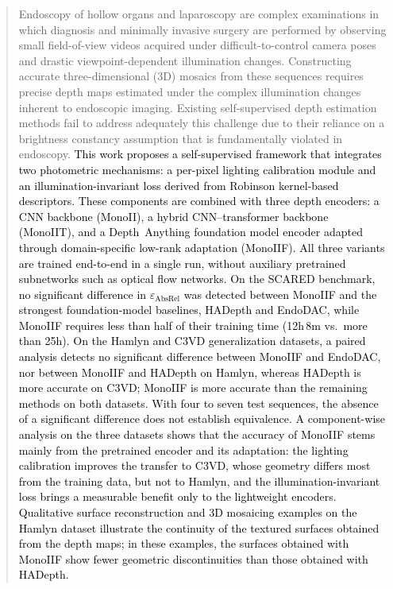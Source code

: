 \documentclass[a4paper,fleqn]{cas-dc}
\begin{document}
\maketitle
\begin{abstract}
%
Endoscopy of hollow organs and laparoscopy are complex examinations 
in which diagnosis and minimally invasive surgery are performed by observing small field-of-view videos acquired under difficult-to-control camera poses and drastic viewpoint-dependent illumination changes.  Constructing accurate three-dimensional (3D) mosaics from these sequences requires precise depth maps estimated under the complex illumination changes inherent to endoscopic imaging.  Existing self-supervised depth estimation methods fail to address adequately this challenge due to their reliance on a brightness constancy assumption that is fundamentally violated in endoscopy. \textcolor{black}{This work proposes a self-supervised framework that integrates two photometric mechanisms: a per-pixel lighting calibration module and an illumination-invariant loss derived from Robinson kernel-based descriptors. These components are combined with three depth encoders: a CNN backbone (MonoII), a hybrid CNN--transformer backbone (MonoIIT), and a Depth~Anything foundation model encoder adapted through domain-specific low-rank adaptation (MonoIIF). All three variants are trained end-to-end in a single run, without auxiliary pretrained subnetworks such as optical flow networks. On the SCARED benchmark, no significant difference in $\varepsilon_\textrm{AbsRel}$ was detected between MonoIIF and the strongest foundation-model baselines, HADepth and EndoDAC, while MonoIIF requires less than half of their training time (12h\,8m vs.\ more than 25h). On the Hamlyn and C3VD generalization datasets, a paired analysis detects no significant difference between MonoIIF and EndoDAC, nor between MonoIIF and HADepth on Hamlyn, whereas HADepth is more accurate on C3VD; MonoIIF is more accurate than the remaining methods on both datasets. With four to seven test sequences, the absence of a significant difference does not establish equivalence. A component-wise analysis on the three datasets shows that the accuracy of MonoIIF stems mainly from the pretrained encoder and its adaptation: the lighting calibration improves the transfer to C3VD, whose geometry differs most from the training data, but not to Hamlyn, and the illumination-invariant loss brings a measurable benefit only to the lightweight encoders. Qualitative surface reconstruction and 3D mosaicing examples on the Hamlyn dataset illustrate the continuity of the textured surfaces obtained from the depth maps; in these examples, the surfaces obtained with MonoIIF show fewer geometric discontinuities than those obtained with HADepth.}
\end{abstract}
\end{document}
